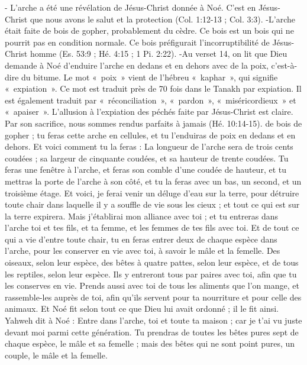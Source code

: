 \begin{multicols}{2}
{- L’arche a été une révélation de Jésus-Christ donnée à Noé.  C’est en Jésus-Christ que nous avons le salut et la protection (Col. 1:12-13 ; Col. 3:3). 
-L’arche était faite de bois de gopher, probablement du cèdre.  Ce bois est un bois qui ne pourrit pas en condition normale. Ce bois préfigurait l’incorruptibilité de Jésus-Christ homme (Es. 53:9 ;  Hé. 4:15 ; 1 Pi. 2:22). 
-Au verset 14, on lit que Dieu demande à Noé d’enduire l’arche en dedans et en dehors avec de la  poix, c’est-à-dire du bitume.  Le mot «~poix~» vient de l’hébreu «~kaphar~», qui signifie «~expiation~».  Ce mot est traduit près de 70 fois dans le Tanakh par expiation.  Il est également traduit par «~réconciliation~», «~pardon~», «~miséricordieux~» et «~apaiser~».  L’allusion à l’expiation des péchés faite par Jésus-Christ est claire. Par son sacrifice, nous sommes rendus parfaits à jamais (Hé. 10:14-15).} de bois de gopher ; tu feras cette arche en cellules, et tu l’enduiras de poix en dedans et en dehors.
Et voici comment tu la feras : La longueur de l'arche sera de trois cents coudées ; sa largeur de cinquante coudées, et sa hauteur de trente coudées.
Tu feras une fenêtre à l'arche, et feras son comble d'une coudée de hauteur, et tu mettras la porte de l'arche à son côté, et tu la feras avec un bas, un second, et un troisième étage.
Et voici, je ferai venir un déluge d'eau sur la terre, pour détruire toute chair dans laquelle il y a souffle de vie sous les cieux ; et tout ce qui est sur la terre expirera.
Mais j'établirai mon alliance avec toi ; et tu entreras dans l'arche toi et tes fils, et ta femme, et les femmes de tes fils avec toi.
Et de tout ce qui a vie d'entre toute chair, tu en feras entrer deux de chaque espèce dans l'arche, pour les conserver en vie avec toi, à savoir le mâle et la femelle.
Des oiseaux, selon leur espèce, des bêtes à quatre pattes, selon leur espèce, et de tous les reptiles, selon leur espèce. Ils y entreront tous par paires avec toi, afin que tu les conserves en vie.
Prends aussi avec toi de tous les aliments que l’on mange, et rassemble-les auprès de toi, afin qu'ils servent pour ta nourriture et pour celle des animaux.
Et Noé fit selon tout ce que Dieu lui avait ordonné ; il le fit ainsi.
\VerseOne{}Yahweh dit à Noé : Entre dans l’arche, toi et toute ta maison ; car je t'ai vu juste devant moi parmi cette génération. 
 Tu prendras de toutes les bêtes pures sept de chaque espèce, le mâle et sa femelle ; mais des bêtes qui ne sont point pures, un couple, le mâle et la femelle.

\end{multicols}

